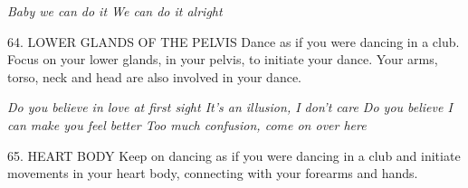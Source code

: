 \page

{\em Baby we can do it\crlf
We can do it alright}

{64. LOWER GLANDS OF THE PELVIS\crlf
Dance as if you were dancing in a club. Focus on your lower glands, in your pelvis, to initiate your dance. Your arms, torso, neck and head are also involved in your dance.}

{\em Do you believe in love at first sight\crlf
It's an illusion, I don't care\crlf
Do you believe I can make you feel better\crlf
Too much confusion, come on over here}

{65. HEART BODY\crlf
Keep on dancing as if you were dancing in a club and initiate movements in your heart body, connecting with your forearms and hands.}

\godown[3em]


\setupcaptions[style=\tfxx\setupinterlinespace,number=no,location=bottom,width=1.45cm,align=middle]
